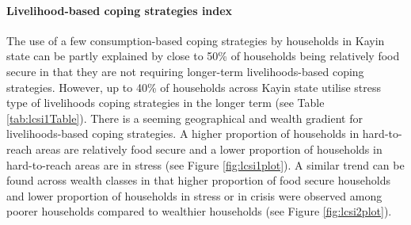 \documentclass[12pt,a4paper]{article}
\let\oldparagraph\paragraph
\renewcommand{\paragraph}[1]{\oldparagraph{#1}\mbox{}}
\begin{document}
\hypertarget{lcsi-results}{%
\paragraph{Livelihood-based coping strategies index}\label{lcsi-results}}

The use of a few consumption-based coping strategies by households in Kayin state can be partly explained by close to 50\% of households being relatively food secure in that they are not requiring longer-term livelihoods-based coping strategies. However, up to 40\% of households across Kayin state utilise stress type of livelihoods coping strategies in the longer term (see Table \ref{tab:lcsi1Table}). There is a seeming geographical and wealth gradient for livelihoods-based coping strategies. A higher proportion of households in hard-to-reach areas are relatively food secure and a lower proportion of households in hard-to-reach areas are in stress (see Figure \ref{fig:lcsi1plot}). A similar trend can be found across wealth classes in that higher proportion of food secure households and lower proportion of households in stress or in crisis were observed among poorer households compared to wealthier households (see Figure \ref{fig:lcsi2plot}).
\end{document}
